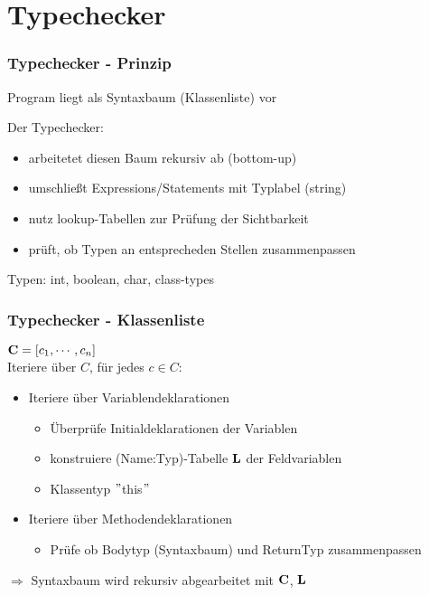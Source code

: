 \section{Typechecker}
\begin{frame}
    \frametitle{Typechecker - Prinzip}

Program liegt als Syntaxbaum (Klassenliste) vor

Der Typechecker:
\begin{itemize}
	\item arbeitetet diesen Baum rekursiv ab (bottom-up)
	\pause
	\item umschließt Expressions/Statements mit Typlabel (string)
	\pause
	\item nutz lookup-Tabellen zur Prüfung der Sichtbarkeit
	\pause
	\item prüft, ob Typen an entsprecheden Stellen zusammenpassen
\end{itemize}
\pause
Typen: int, boolean, char, class-types
\end{frame}

\begin{frame}
    \frametitle{Typechecker - Klassenliste}
${\bf C} = [c_1, \cdots , c_n]$ \\
Iteriere über $C$, für jedes $c \in C$:
\begin{itemize}
    \item Iteriere über Variablendeklarationen
    \begin{itemize}
        \item Überprüfe Initialdeklarationen der Variablen 
        \item konstruiere (Name:Typ)-Tabelle ${\bf L}$ der Feldvariablen
        \item Klassentyp $"$this$"$
    \end{itemize}
    \item Iteriere über Methodendeklarationen
    \begin{itemize}
        \item Prüfe ob Bodytyp (Syntaxbaum) und ReturnTyp zusammenpassen
    \end{itemize}
\end{itemize}
$\Rightarrow$ Syntaxbaum wird rekursiv abgearbeitet mit ${\bf C}$, ${\bf L}$
\end{frame}

